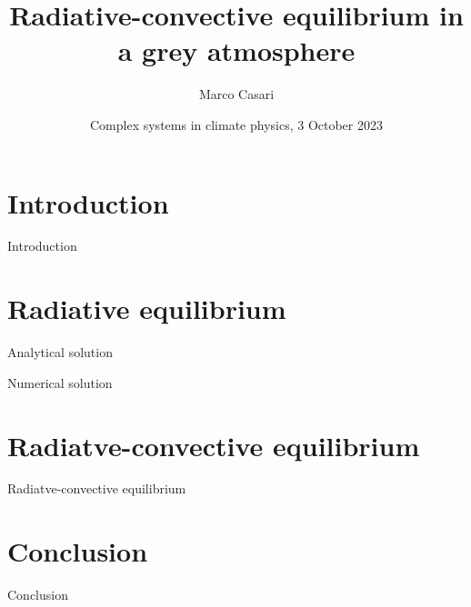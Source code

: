 \documentclass[aspectratio=43]{beamer}
\title{Radiative-convective equilibrium in a grey atmosphere}
\author{Marco Casari}
\date[03/10/2023]{Complex systems in climate physics, 3 October 2023}
\institute[UniTo]{University of Turin}
\begin{document}
\begin{frame}
  \titlepage
\end{frame}



\section{Introduction}
\begin{frame}{Introduction}
\end{frame}



\section{Radiative equilibrium}
\begin{frame}{Analytical solution}
\end{frame}

\begin{frame}{Numerical solution}
\end{frame}


\section{Radiatve-convective equilibrium}
\begin{frame}{Radiatve-convective equilibrium}
\end{frame}



\section{Conclusion}
\begin{frame}{Conclusion}
\end{frame}
\end{document}
